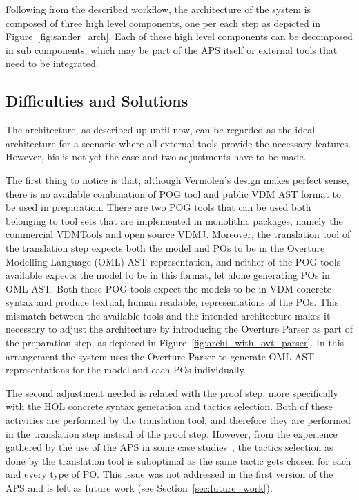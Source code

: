 \documentclass[]{article}
\begin{document}
Following from the described workflow, the architecture of the system is composed of three high level components, one per each step as depicted in Figure~\ref{fig:sander_arch}.
Each of these high level components can be decomposed in sub components, which may be part of the APS itself or external tools that need to be integrated.


\subsection{Difficulties and Solutions}
\label{sub:architectural_difficulties}

The architecture, as described up until now, can be regarded as the ideal architecture for a scenario where all external tools provide the necessary features.
However, his is not yet the case and two adjustments have to be made.

The first thing to notice is that, although Verm\"olen's design makes perfect sense, there is no available combination of POG tool and public VDM AST format to be used in preparation.
There are two POG tools that can be used both belonging to tool sets that are implemented in monolithic packages, namely the commercial VDMTools and open source VDMJ.
Moreover, the translation tool of the translation step expects both the model and POs to be in the Overture Modelling Language (OML) AST representation, and neither of the POG tools available expects the model to be in this format, let alone generating POs in OML AST.
Both these POG tools expect the models to be in VDM concrete syntax and produce textual, human readable, representations of the POs.
This mismatch between the available tools and the intended architecture makes it necessary to adjust the architecture by introducing the Overture Parser as part of the preparation step, as depicted in Figure~\ref{fig:archi_with_ovt_parser}.
In this arrangement the system uses the Overture Parser to generate OML AST representations for the model and each POs individually.

The second adjustment needed is related with the proof step, more specifically with the HOL concrete syntax generation and tactics selection.
Both of these activities are performed by the translation tool, and therefore they are performed in the translation step instead of the proof step.
However, from the experience gathered by the use of the APS in some case studies~\cite{MiguelMSc,SBMF09paper}, the tactics selection as done by the translation tool is suboptimal as the same tactic gets chosen for each and every type of PO.
This issue was not addressed in the first version of the APS and is left as future work (see Section~\ref{sec:future_work}).
\end{document}
